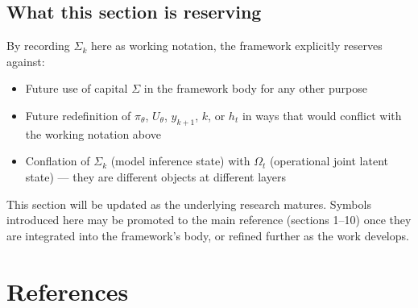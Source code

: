 \documentclass[11pt]{article}
\begin{document}
\subsection*{What this section is reserving}

By recording $\Sigma_k$ here as working notation, the framework explicitly reserves against:

\begin{itemize}
\item Future use of capital $\Sigma$ in the framework body for any other purpose
\item Future redefinition of $\pi_\theta$, $U_\theta$, $y_{k+1}$, $k$, or $h_t$ in ways that would conflict with the working notation above
\item Conflation of $\Sigma_k$ (model inference state) with $\Omega_t$ (operational joint latent state) --- they are different objects at different layers
\end{itemize}

This section will be updated as the underlying research matures. Symbols introduced here may be promoted to the main reference (sections 1--10) once they are integrated into the framework's body, or refined further as the work develops.

\section*{References}
\end{document}
